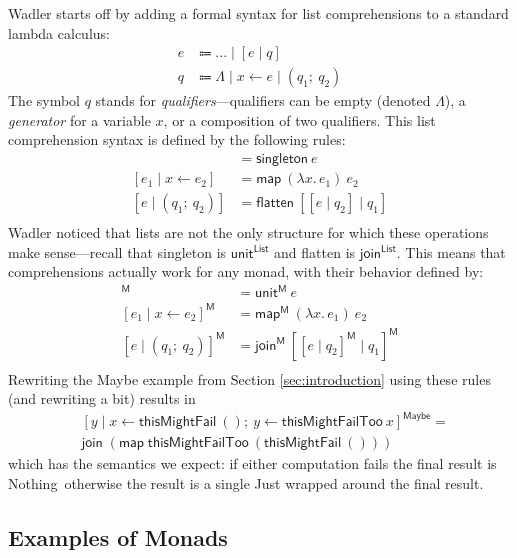 \documentclass[acmsmall, nonacm, screen]{acmart}
\newcommand{\lambdaE}[2]{\lambda #1.\, #2}
\newcommand{\nothing}{\textsf{Nothing}}
\newcommand{\map}[3]{\textsf{map}^{\textsf{#1}}~#2~#3}
\newcommand{\unit}[2]{\textsf{unit}^{\textsf{#1}}~#2}
\newcommand{\join}[2]{\textsf{join}^{\textsf{#1}}~#2}
\begin{document}
Wadler starts off by adding a formal syntax for list comprehensions to a standard lambda calculus:
\begin{align*}
 e &\Coloneqq ... \mid [e \mid q] \\
 q &\Coloneqq \Lambda \mid x \leftarrow e \mid (q_1;\ q_2)
\end{align*}
The symbol $q$ stands for {\em qualifiers}---qualifiers can be empty (denoted $\Lambda$), a {\em
generator} for a variable $x$, or a composition of two qualifiers. This list comprehension syntax
is defined by the following rules:
\begin{align*}
  [e \mid \Lambda] &= \textsf{singleton}~e \\
  [e_1 \mid x \leftarrow e_2] &= \textsf{map}~(\lambdaE{x}{e_1})~e_2 \\
  [e \mid (q_1;\ q_2)] &= \textsf{flatten}~[[e \mid q_2] \mid q_1] \\
\end{align*}
Wadler noticed that lists are not the only structure for which these operations make
sense---recall that \textsf{singleton} is $\textsf{unit}^{\textsf{List}}$ and \textsf{flatten} is
$\textsf{join}^{\textsf{List}}$. This means that comprehensions actually work for any monad, with
their behavior defined by:
\begin{align*}
  [e \mid \Lambda]^{\textsf{M}} &= \unit{M}{e} \\
  [e_1 \mid x \leftarrow e_2]^{\textsf{M}} &= \map{M}{(\lambdaE{x}{e_1})}{e_2} \\
  [e \mid (q_1;\ q_2)]^{\textsf{M}} &= \join{M}{[[e \mid q_2]^{\textsf{M}} \mid q_1]^{\textsf{M}}} \\
\end{align*}
Rewriting the \textsf{Maybe} example from Section \ref{sec:introduction} using these rules (and
rewriting a bit) results in
\begin{align*}
  &[ y \mid x \leftarrow \textsf{thisMightFail}~() ;\ y \leftarrow \textsf{thisMightFailToo}~{x} ]^{\textsf{Maybe}} = \\
  &\join{}{(\map{}{\textsf{thisMightFailToo}}{(\textsf{thisMightFail}~())})}
\end{align*}
which has the semantics we expect: if either computation fails the final result is \nothing\,
otherwise the result is a single \textsf{Just} wrapped around the final result.

\subsection{Examples of Monads} \label{sec:monad-examples}
\end{document}
